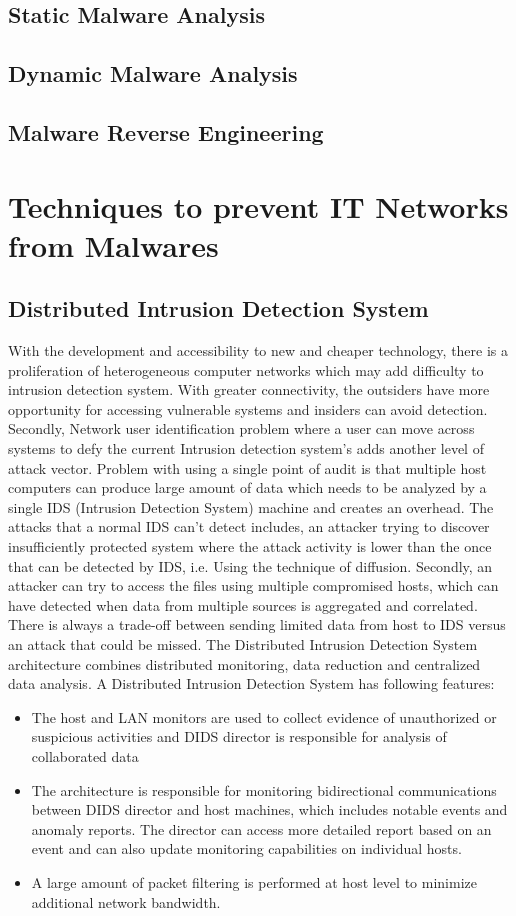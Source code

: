 \documentclass[11pt]{article}
\begin{document}
	\subsection{Static Malware Analysis}
	\subsection{Dynamic Malware Analysis}
	\subsection{Malware Reverse Engineering}
	
	\section{Techniques to prevent IT Networks from Malwares}
	\subsection{Distributed Intrusion Detection System}
	With the development and accessibility to new and cheaper technology, there is a proliferation of heterogeneous computer networks which may add difficulty to intrusion detection system. With greater connectivity, the outsiders have more opportunity for accessing vulnerable systems and insiders can avoid detection. Secondly, Network user identification problem where a user can move across systems to defy the current Intrusion detection system's adds another level of attack vector. Problem with using a single point of audit is that multiple host computers can produce large amount of data which needs to be analyzed by a single IDS (Intrusion Detection System) machine and creates an overhead. The attacks that a normal IDS can’t detect includes, an attacker trying to discover insufficiently protected system where the attack activity is lower than the once that can be detected by IDS, i.e. Using the technique of diffusion. Secondly, an attacker can try to access the files using multiple compromised hosts, which can have detected when data from multiple sources is aggregated and correlated. There is always a trade-off between sending limited data from host to IDS versus an attack that could be missed.
	The Distributed Intrusion Detection System architecture combines distributed monitoring, data reduction and centralized data analysis. A Distributed Intrusion Detection System has following features:
	\begin{itemize}
		\item The host and LAN monitors are used to collect evidence of unauthorized or suspicious activities and DIDS director is responsible for analysis of collaborated data
		\item The architecture is responsible for monitoring bidirectional communications between DIDS director and host machines, which includes notable events and anomaly reports. The director can access more detailed report based on an event and can also update monitoring capabilities on individual hosts.
		\item A large amount of packet filtering is performed at host level to minimize additional network bandwidth.
	\end{itemize}
\end{document}
